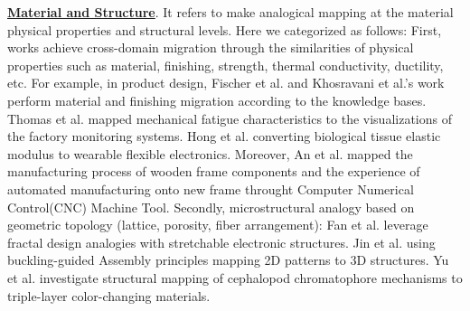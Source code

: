 \textbf{\underline{Material and Structure}}. It refers to make analogical mapping at the material physical properties and structural levels. Here we categorized as follows: First, works achieve cross-domain migration through the similarities of physical properties such as material, finishing, strength, thermal conductivity, ductility, etc. For example, in product design, Fischer et al. and Khosravani
et al.'s work perform material and finishing migration according to the knowledge bases\cite{fischer2024nerf, khosravani2022intelligent}. Thomas et al. mapped mechanical fatigue characteristics to the visualizations of the factory monitoring systems\cite{thomas2013extending}. Hong et al. converting biological tissue elastic modulus to wearable flexible electronics\cite{hong2024fishbone}. Moreover, An et al. mapped the manufacturing process of wooden frame components and the experience of automated manufacturing onto new frame throught Computer Numerical Control(CNC) Machine Tool\cite{an2020bim}.
Secondly, microstructural analogy based on geometric topology (lattice, porosity, fiber arrangement): Fan et al. leverage fractal design analogies with stretchable electronic structures\cite{fan2014fractal}. Jin et al. using buckling-guided Assembly principles mapping 2D patterns to 3D structures\cite{jin2023deep}. Yu et al. investigate structural mapping of cephalopod chromatophore mechanisms to triple-layer color-changing materials\cite{yu2014adaptive}.






